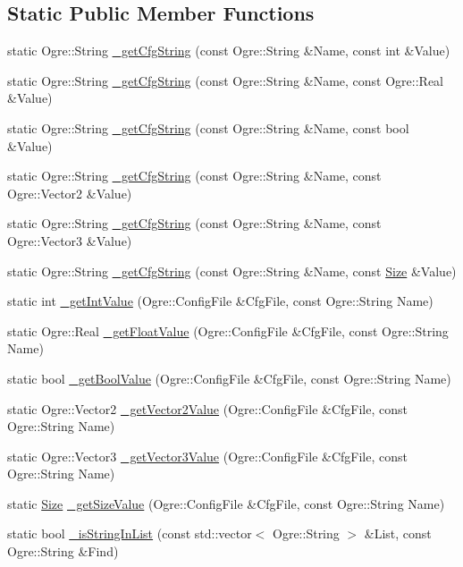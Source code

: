 \subsection*{Static Public Member Functions}
\begin{CompactItemize}
\item 
static Ogre::String \hyperlink{class_hydrax_1_1_cfg_file_manager_020c0d58713f7ecbd396101247bcab1b}{\_\-getCfgString} (const Ogre::String \&Name, const int \&Value)
\item 
static Ogre::String \hyperlink{class_hydrax_1_1_cfg_file_manager_8761a9aa82111e2d20a6beb4a3e3b5ed}{\_\-getCfgString} (const Ogre::String \&Name, const Ogre::Real \&Value)
\item 
static Ogre::String \hyperlink{class_hydrax_1_1_cfg_file_manager_b87e26d4e678cc8daff159bf9e8c3f7d}{\_\-getCfgString} (const Ogre::String \&Name, const bool \&Value)
\item 
static Ogre::String \hyperlink{class_hydrax_1_1_cfg_file_manager_a5ade5614a7f6958e0df8031fddfac4b}{\_\-getCfgString} (const Ogre::String \&Name, const Ogre::Vector2 \&Value)
\item 
static Ogre::String \hyperlink{class_hydrax_1_1_cfg_file_manager_843c4e461bdd3d70b449c3b941684209}{\_\-getCfgString} (const Ogre::String \&Name, const Ogre::Vector3 \&Value)
\item 
static Ogre::String \hyperlink{class_hydrax_1_1_cfg_file_manager_6b42513df69c7ec5ca81b73a82bd637c}{\_\-getCfgString} (const Ogre::String \&Name, const \hyperlink{struct_hydrax_1_1_size}{Size} \&Value)
\item 
static int \hyperlink{class_hydrax_1_1_cfg_file_manager_f55d91d6fe191edaf32752db39bde7ee}{\_\-getIntValue} (Ogre::ConfigFile \&CfgFile, const Ogre::String Name)
\item 
static Ogre::Real \hyperlink{class_hydrax_1_1_cfg_file_manager_6d5259e0ccd2bd730310c7229c16eecb}{\_\-getFloatValue} (Ogre::ConfigFile \&CfgFile, const Ogre::String Name)
\item 
static bool \hyperlink{class_hydrax_1_1_cfg_file_manager_a384e0c4c7444fbe2aea75a74ecc6c6c}{\_\-getBoolValue} (Ogre::ConfigFile \&CfgFile, const Ogre::String Name)
\item 
static Ogre::Vector2 \hyperlink{class_hydrax_1_1_cfg_file_manager_b29b2f7baca55593751de31f570fbfa9}{\_\-getVector2Value} (Ogre::ConfigFile \&CfgFile, const Ogre::String Name)
\item 
static Ogre::Vector3 \hyperlink{class_hydrax_1_1_cfg_file_manager_573e9bca71aa4fffbf84c5409c84f9ae}{\_\-getVector3Value} (Ogre::ConfigFile \&CfgFile, const Ogre::String Name)
\item 
static \hyperlink{struct_hydrax_1_1_size}{Size} \hyperlink{class_hydrax_1_1_cfg_file_manager_1d688a86347f04a920dafead01343a5b}{\_\-getSizeValue} (Ogre::ConfigFile \&CfgFile, const Ogre::String Name)
\item 
static bool \hyperlink{class_hydrax_1_1_cfg_file_manager_feef5772fec0c214f374cbd3cf9f1a17}{\_\-isStringInList} (const std::vector$<$ Ogre::String $>$ \&List, const Ogre::String \&Find)
\end{CompactItemize}


